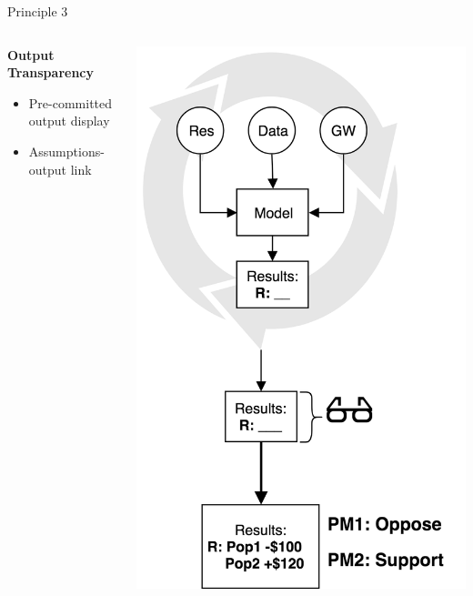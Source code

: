 \documentclass{beamer}
\begin{document}
\begin{frame}{Principle 3}
\begin{columns}
\begin{column}{0.35\textwidth}
 \textbf{Output \\ Transparency}
   \begin{itemize}
   \item Pre-committed output display
   \item Assumptions- output link
   \end{itemize}
\end{column}
\begin{column}{0.7\textwidth}  %
    \begin{center}
    \vspace{-2em}
     \includegraphics[width=.6\textwidth]{../Images/o_transp.png}
     \end{center}
\end{column}
\end{columns}
\end{frame}
\end{document}
